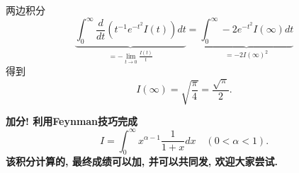 \begin{itemize}
两边积分
$$
\underbrace{\int_0^{\infty} \frac{d}{d t}\left(t^{-1} e^{-t^2} I(t)\right) d t}_{=-\lim _{t \rightarrow 0} \frac{I(t)}{t}}=\underbrace{\int_0^{\infty}-2 e^{-t^2} I(\infty) d t}_{=-2 I(\infty)^2}
$$
得到
$$
I(\infty) = \sqrt{\frac{\pi}{4}} = \frac{\sqrt{\pi}}{2}.
$$

\end{itemize}


\textbf{加分! 利用Feynman技巧完成  
$$
I=\int_0^{\infty} x^{\alpha-1} \frac{1}{1+x} d x \quad(0<\alpha<1).
$$
该积分计算的, 最终成绩可以加{\color{red}{5分}}, 并可以共同发{\color{red}{一篇学术论文}}, 欢迎大家尝试.}